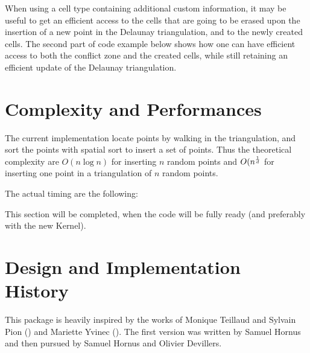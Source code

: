 When using a cell type containing additional custom information, it may be
useful to get an efficient access to the cells that are going to be erased
upon the insertion of a new point in the Delaunay triangulation, and to the newly
created cells. The second part of code example below shows how one can have efficient
access to both the conflict zone and the created cells, while still
retaining an efficient update of the Delaunay triangulation.



\section{Complexity and Performances}

The current implementation locate points by walking in the
triangulation, and sort the points with spatial sort to insert a
set of points. Thus the theoretical complexity are
$O(n\log n)$ for inserting $n$ random points and $O(n^{\frac{1}{d}}$
for inserting one point in a triangulation of $n$ random points.

The actual timing are the following:



This section will be completed, when the code will be fully ready (and
preferably with the new Kernel).


\section{Design and Implementation History}

This package is heavily inspired by the works of
 Monique Teillaud and Sylvain Pion ()
and Mariette Yvinec ().
The first version was written by Samuel Hornus and then
pursued by Samuel Hornus and Olivier Devillers.
